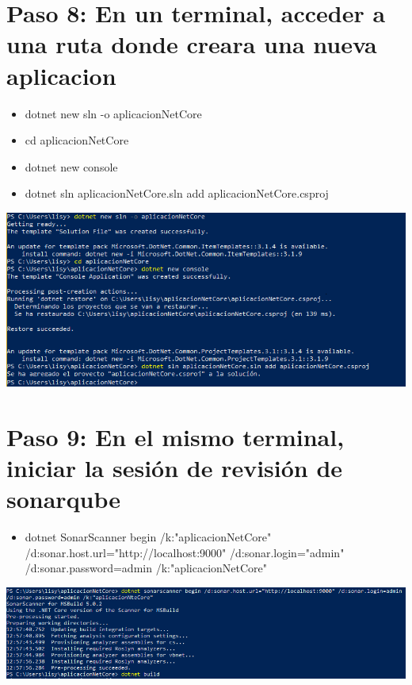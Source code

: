 \section{Paso 8: En un terminal, acceder a una ruta donde creara una nueva aplicacion } 
\begin{itemize}
    \item dotnet new sln -o aplicacionNetCore 
    \item cd aplicacionNetCore 
    \item dotnet new console
    \item dotnet sln aplicacionNetCore.sln add aplicacionNetCore.csproj 
\end{itemize}
\begin{center}
\includegraphics[width=\columnwidth]{images/12}\newline

\end{center}
\section{Paso 9: En el mismo terminal, iniciar la sesión de revisión de sonarqube } 
\begin{itemize}
    \item dotnet SonarScanner begin /k:"aplicacionNetCore" /d:sonar.host.url="http://localhost:9000" /d:sonar.login="admin" /d:sonar.password=admin /k:"aplicacionNetCore"
\end{itemize}
\begin{center}
\includegraphics[width=\columnwidth]{images/13}\newline
\end{center}
